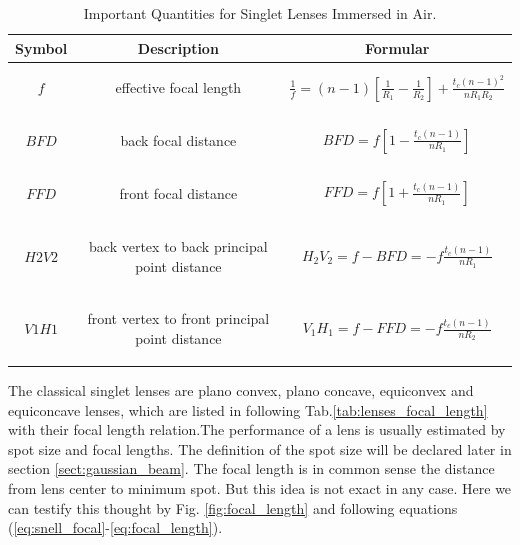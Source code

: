 \begin{table}
\centering
\caption{Important Quantities for Singlet Lenses Immersed in Air\cite{lens_theory_LC_Ltd}.}
\begin{tabular}{|c|c|c|}
\hline
\textbf{Symbol}&\textbf{Description}&\textbf{Formular}\\
\hline
$f$ & \parbox[c]{6cm}{
						\begin{center}
						effective focal length
						\end{center}
				}& $\frac{1}{f}=(n-1)\left[\frac{1}{R_{1}}-\frac{1}{R_{2}} \right]+\frac{t_{c}(n-1)^2}{nR_{1}R_{2}}$ \\
\hline
$BFD$ &\parbox[c]{6cm}{
						\begin{center}
						back focal distance 
						\end{center}
			}& $BFD=f\left[ 1-\frac{t_{c}(n-1)}{nR_{1}}\right]$ \\
\hline
$FFD$ &\parbox[c]{6cm}{
						\begin{center}
						 front focal distance
						 \end{center} 
			}& $FFD=f\left[ 1+\frac{t_{c}(n-1)}{nR_{1}}\right]$ \\
\hline
$H2V2$ & \parbox[c]{6cm}{
						\begin{center}
						back vertex to back principal point distance
						\end{center}						
			} & $H_{2}V_{2}=f-BFD=-f\frac{t_{c}(n-1)}{nR_{1}}$ \\
\hline
$V1H1$ & \parbox[c]{6cm}{
						\begin{center}			
				    front vertex to front principal point distance
				    \end{center}
				 } & $V_{1}H_{1}=f-FFD=-f\frac{t_{c}(n-1)}{nR_{2}}$ \\
\hline
\end{tabular}
\label{tab:lens_quantities}
\end{table}
The classical singlet lenses are plano convex, plano concave, equiconvex and equiconcave lenses, which are listed in following Tab.\ref{tab:lenses_focal_length} with their focal length relation.The performance of a lens is usually estimated by spot size and focal lengths. The definition of the spot size will be declared later in section \ref{sect:gaussian_beam}. The focal length is in common sense the distance from lens center to minimum spot. But this idea is not exact in any case.  Here we can testify this thought by Fig. \ref{fig:focal_length} and following equations (\ref{eq:snell_focal}-\ref{eq:focal_length}).\\
